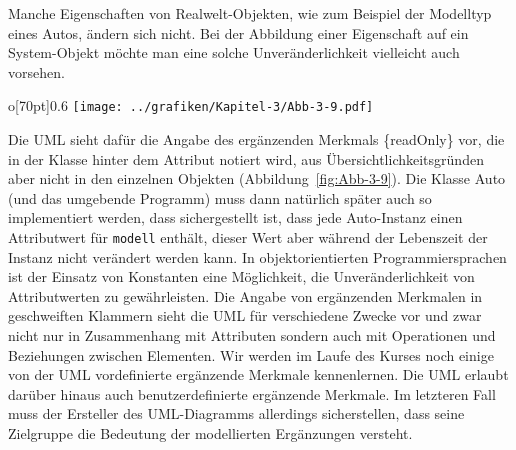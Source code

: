 Manche Eigenschaften von Realwelt-Objekten, wie zum Beispiel der Modelltyp eines Autos, ändern sich nicht. Bei der Abbildung einer Eigenschaft auf ein System-Objekt möchte man eine solche Unveränderlichkeit vielleicht auch vorsehen. 
\begin{wrapfigure}{o}[70pt]{0.6\textwidth}
	\centering 
	\texttt{[image: ../grafiken/Kapitel-3/Abb-3-9.pdf]}
	\caption{Eine Klasse Auto mit einem unveränderlichen Attribut \texttt{modell} und einem veränderlichen Attribut \texttt{farbe}}
	\label{fig:Abb-3-9}
	\vspace{-6pt}
\end{wrapfigure}
Die UML sieht dafür die Angabe des ergänzenden Merkmals \{readOnly\} vor, die in der Klasse hinter dem Attribut notiert wird, aus Übersichtlichkeitsgründen aber nicht in den einzelnen Objekten (Abbildung~\ref{fig:Abb-3-9}). Die Klasse Auto (und das umgebende Programm) muss dann natürlich später auch so implementiert werden, dass sichergestellt ist, dass jede Auto-Instanz einen Attributwert für \texttt{modell} enthält, dieser Wert aber während der Lebenszeit der Instanz nicht verändert werden kann. In objektorientierten Programmiersprachen ist der Einsatz von Konstanten eine Möglichkeit, die Unveränderlichkeit von Attributwerten zu gewährleisten. Die Angabe von ergänzenden Merkmalen in geschweiften Klammern sieht die UML für verschiedene Zwecke vor und zwar nicht nur in Zusammenhang mit Attributen sondern auch mit Operationen und Beziehungen zwischen Elementen. Wir werden im Laufe des Kurses noch einige von der UML vordefinierte ergänzende Merkmale kennenlernen. Die UML erlaubt darüber hinaus auch benutzerdefinierte ergänzende Merkmale. Im letzteren Fall muss der Ersteller des UML-Diagramms allerdings sicherstellen, dass seine Zielgruppe die Bedeutung der modellierten Ergänzungen versteht.

